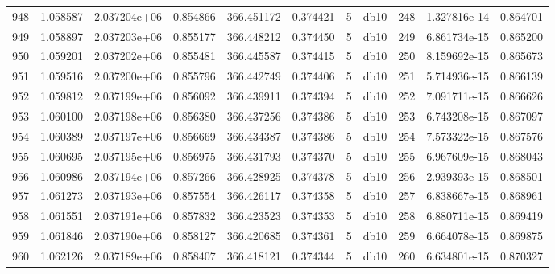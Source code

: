 \begin{tabular}{lrrrrrrlrrr}
948  &    1.058587 &        2.037204e+06 &  0.854866 &              366.451172 &    0.374421 &       5 &         db10 &    248 &   1.327816e-14 &      0.864701 \\
949  &    1.058897 &        2.037203e+06 &  0.855177 &              366.448212 &    0.374450 &       5 &         db10 &    249 &   6.861734e-15 &      0.865200 \\
950  &    1.059201 &        2.037202e+06 &  0.855481 &              366.445587 &    0.374415 &       5 &         db10 &    250 &   8.159692e-15 &      0.865673 \\
951  &    1.059516 &        2.037200e+06 &  0.855796 &              366.442749 &    0.374406 &       5 &         db10 &    251 &   5.714936e-15 &      0.866139 \\
952  &    1.059812 &        2.037199e+06 &  0.856092 &              366.439911 &    0.374394 &       5 &         db10 &    252 &   7.091711e-15 &      0.866626 \\
953  &    1.060100 &        2.037198e+06 &  0.856380 &              366.437256 &    0.374386 &       5 &         db10 &    253 &   6.743208e-15 &      0.867097 \\
954  &    1.060389 &        2.037197e+06 &  0.856669 &              366.434387 &    0.374386 &       5 &         db10 &    254 &   7.573322e-15 &      0.867576 \\
955  &    1.060695 &        2.037195e+06 &  0.856975 &              366.431793 &    0.374370 &       5 &         db10 &    255 &   6.967609e-15 &      0.868043 \\
956  &    1.060986 &        2.037194e+06 &  0.857266 &              366.428925 &    0.374378 &       5 &         db10 &    256 &   2.939393e-15 &      0.868501 \\
957  &    1.061273 &        2.037193e+06 &  0.857554 &              366.426117 &    0.374358 &       5 &         db10 &    257 &   6.838667e-15 &      0.868961 \\
958  &    1.061551 &        2.037191e+06 &  0.857832 &              366.423523 &    0.374353 &       5 &         db10 &    258 &   6.880711e-15 &      0.869419 \\
959  &    1.061846 &        2.037190e+06 &  0.858127 &              366.420685 &    0.374361 &       5 &         db10 &    259 &   6.664078e-15 &      0.869875 \\
960  &    1.062126 &        2.037189e+06 &  0.858407 &              366.418121 &    0.374344 &       5 &         db10 &    260 &   6.634801e-15 &      0.870327 \\

\end{tabular}
